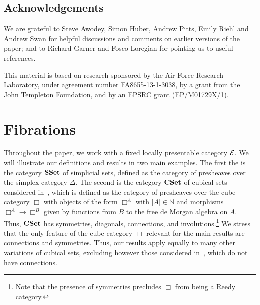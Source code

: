 \documentclass[reqno,10pt,a4paper,oneside,draft]{amsart}
\begin{document}
\subsection*{Acknowledgements}

We are grateful to Steve Awodey, Simon Huber, Andrew Pitts, Emily Riehl and Andrew Swan for helpful discussions and comments on earlier versions of the paper; and to Richard Garner and Fosco Loregian for pointing us to useful references.

This material is based on research sponsored by the Air Force Research Laboratory, under agreement number FA8655-13-1-3038, by a grant from the John Templeton Foundation, and by an EPSRC grant (EP/M01729X/1).

\newpage

\section{Fibrations}

Throughout the paper, we work with a fixed locally presentable category $\mathcal{E}$. We will illustrate our definitions and
results in two main examples. The first the is the category $\mathbf{SSet}$ of simplicial sets, defined as the category of 
presheaves over the simplex category $\Delta$. The second is the category $\mathbf{CSet}$ of cubical sets considered 
in~\cite{cohen-et-al:cubicaltt}, which is defined as the category of presheaves over 
the cube category $\Box$ with objects of the form $\Box^A$ with $|A| \in \mathbb{N}$ and morphisms~$\Box^A \to \Box^B$ given by functions from $B$ to the free de Morgan algebra on $A$. Thus, $\mathbf{CSet}$ has symmetries, diagonals, connections, and involutions.\footnote{Note that the presence of symmetries precludes $\Box$ from being a Reedy category.} We stress that the only feature of the cube category $\Box$ relevant for the main results  are connections and symmetries.
Thus, our results apply equally to many other variations of cubical sets, excluding however those considered in~\cite{coquand-cubical-sets,huber-thesis}, which do not have connections.
\end{document}
